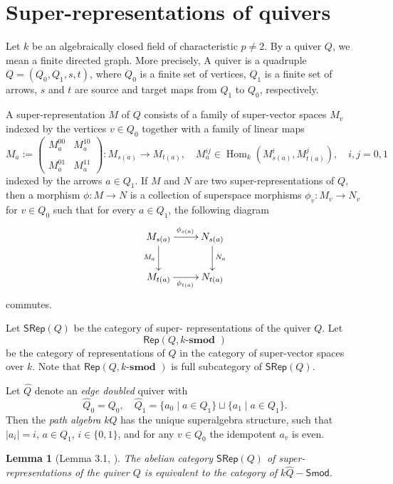 \documentclass[12pt, reqno]{amsart}
\theoremstyle{plain}
\newtheorem{lemma}[theorem]{Lemma}
\numberwithin{equation}{section}
\def \ra{\rightarrow}
\newcommand{\Hom}{\operatorname{Hom}\nolimits}
\newcommand{\smod} {k\text{-}\textbf{smod }}
\begin{document}
\section{Super-representations of quivers}
Let $k$ be an algebraically closed field of characteristic $p\neq 2$. By a quiver $Q$, we mean a finite
directed graph. More precisely, A quiver is a quadruple $Q = (Q_0, Q_1, s, t)$, where $Q_0$ is a finite 
set of vertices, $Q_1$ is a finite set of arrows, $s$ and $t$ are source and target maps from $Q_1$ 
to $Q_0$, respectively.

A super-representation $M$ of $Q$ consists of a family of 
super-vector spaces $M_v$ indexed by the vertices $v\in Q_0$ together with a family 
of linear maps 
\[
M_a := \begin{pmatrix}
    M_a^{00} & M_a^{10} \\
    & \\
    M_a^{01} & M_a^{11}
\end{pmatrix}: M_{s(a)} \to M_{t(a)}, \quad M_a^{ij}\in \Hom_k(M_{s(a)}^i, M_{t(a)}^j), \quad i,j= 0,1
\]
indexed by the arrows
$a \in Q_1$. If $M$ and $N$ are two super-representations of $Q$, then
a morphism $\phi \colon M \ra N$ is a collection of superspace morphisms 
$\phi_v \colon M_v \ra N_v$ for $v \in Q_0$ such that for every $a\in Q_1$, 
the following diagram
\[
\xymatrix{
M_{s(a)}\ar[r]^{\phi_{s(a)}} \ar[d]_{M_a} & N_{s(a)}\ar[d]^{N_a}\\
M_{t(a)} \ar[r]_{\phi_{t(a)}} & N_{t(a)}
}
\]
commutes.

Let $\mathsf{SRep}(Q)$ be the category of super- representations of the quiver $Q$. Let 
$$
\mathsf{Rep}(Q, \smod)
$$ 
be the category of representations of $Q$ in the category of super-vector spaces over $k$. 
Note that $\mathsf{Rep}(Q, \smod)$ is full subcategory of 
$\mathsf{SRep}(Q)$.

Let $\widehat{Q}$ denote an \emph{edge doubled} quiver with 
\[
\widehat{Q}_0=Q_0, \quad \widehat{Q}_1=\{a_0\mid a\in Q_1\}\sqcup \{a_1\mid a\in Q_1\}.
\] 
Then the \emph{path algebra} $k\widehat{Q}$ has the unique superalgebra structure, such that $|a_i|=i$, $a\in Q_1$, $i\in\{0, 1\}$, and for any $v\in Q_0$ the idempotent $a_v$ is even.

\begin{lemma} [Lemma 3.1, \cite{BZ20}]
The abelian category $\mathsf{SRep}(Q)$ of super-representations of the quiver $Q$ is equivalent to
the category of $k\widehat{Q}-\mathsf{Smod}$.
\end{lemma}
\end{document}

